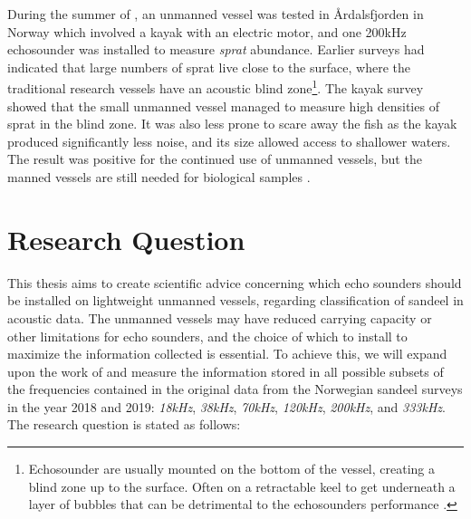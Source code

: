         
        
        
        During the summer of \citeyear{johnsen2020measuring}, an unmanned vessel was tested in Årdalsfjorden in Norway which involved a kayak with an electric motor, and one 200kHz echosounder was installed to measure \textit{sprat} abundance. Earlier surveys had indicated that large numbers of sprat live close to the surface, where the traditional research vessels have an acoustic blind zone\footnote{Echosounder are usually mounted on the bottom of the vessel, creating a blind zone up to the surface. Often on a retractable keel to get underneath a layer of bubbles that can be detrimental to the echosounders performance \cite{korneliussen2008proposals}.}. The kayak survey showed that the small unmanned vessel managed to measure high densities of sprat in the blind zone. It was also less prone to scare away the fish as the kayak produced significantly less noise, and its size allowed access to shallower waters. The result was positive for the continued use of unmanned vessels, but the manned vessels are still needed for biological samples \cite{johnsen2020measuring}.
        


\section{Research Question}

        This thesis aims to create scientific advice concerning which echo sounders should be installed on lightweight unmanned vessels, regarding classification of sandeel in acoustic data. The unmanned vessels may have reduced carrying capacity or other limitations for echo sounders, and the choice of which to install to maximize the information collected is essential. To achieve this, we will expand upon the work of \citet{brautaset2020acoustic} and measure the information stored in all possible subsets of the frequencies contained in the original data from the Norwegian sandeel surveys in the year 2018 and 2019: \textit{18kHz}, \textit{38kHz}, \textit{70kHz}, \textit{120kHz}, \textit{200kHz}, and \textit{333kHz}. The research question is stated as follows:
        
